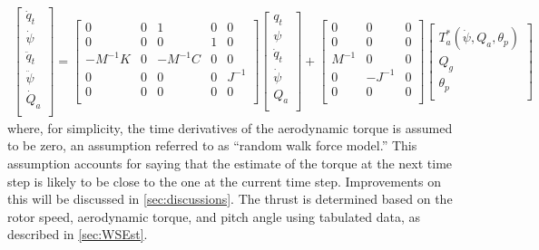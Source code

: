 \documentclass[wes, manuscript]{copernicus}
\begin{document}
\begin{align}
\begin{bmatrix}
    \dot{q}_t   \\
    \dot{\psi}  \\
    \ddot{q}_t  \\
    \ddot{\psi} \\
    \dot{Q}_a   \\
\end{bmatrix}
=
\begin{bmatrix}
0        & 0 & 1        & 0 & 0      \\
0        & 0 & 0        & 1 & 0      \\
-M^{-1}K & 0 & -M^{-1}C & 0 & 0      \\
0        & 0 & 0        & 0 & J^{-1} \\
0        & 0 & 0        & 0 &  0     \\
\end{bmatrix}
\begin{bmatrix}
    q_t        \\
    \psi       \\
    \dot{q}_t  \\
    \dot{\psi} \\
    Q_a        \\
\end{bmatrix}
+
\begin{bmatrix}
    0      & 0       & 0 \\
    0      & 0       & 0 \\
    M^{-1} & 0       & 0 \\
    0      & -J^{-1} & 0 \\
    0      & 0       & 0 \\
\end{bmatrix}
\begin{bmatrix}
 T_a^*(\dot{\psi},Q_a,\theta_p)\\
 Q_g   \\
\theta_p\\
\end{bmatrix}
   \label{eq:StateEq2DOF}
\end{align}
where, for simplicity, the time derivatives of the aerodynamic torque is assumed to be zero, an assumption referred to as ``random walk force model.'' This assumption accounts for saying that the estimate of the torque at the next time step is likely to be close to the one at the current time step. Improvements on this will be discussed in \autoref{sec:discussions}.
The thrust is determined based on the rotor speed, aerodynamic torque, and pitch angle using tabulated data, as described in \autoref{sec:WSEst}.
\end{document}
